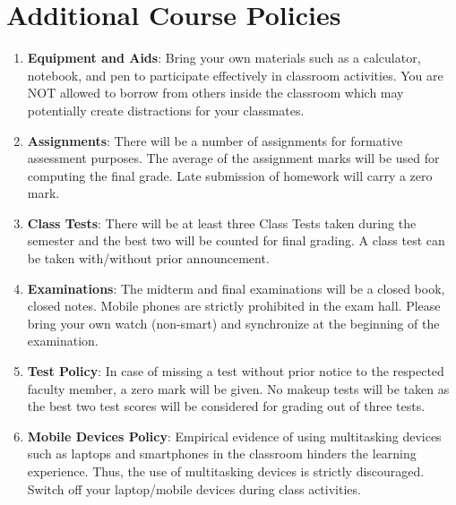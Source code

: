 \section{Additional Course Policies}

\begin{enumerate}
\item \textbf{Equipment and Aids}: Bring your own materials such as a calculator, notebook, and pen to participate effectively in classroom activities. You are NOT allowed to borrow from others inside the classroom which may potentially create distractions for your classmates.
\item \textbf{Assignments}: There will be a number of assignments for formative assessment purposes. The average of the assignment marks will be used for computing the final grade. Late submission of homework will carry a zero mark. 
\item \textbf{Class Tests}: There will be at least three Class Tests taken during the semester and the best two will be counted for final grading. A class test can be taken with/without prior announcement.
\item \textbf{Examinations}: The midterm and final examinations will be a closed book, closed notes. Mobile phones are strictly prohibited in the exam hall. Please bring your own watch (non-smart) and synchronize at the beginning of the examination. 
\item \textbf{Test Policy}: In case of missing a test without prior notice to the respected faculty member, a zero mark will be given. No makeup tests will be taken as the best two test scores will be considered for grading out of three tests. 
\item \textbf{Mobile Devices Policy}: Empirical evidence of using multitasking devices such as laptops and smartphones in the classroom hinders the learning experience. Thus, the use of multitasking devices is strictly discouraged. Switch off your laptop/mobile devices during class activities.
\end{enumerate}